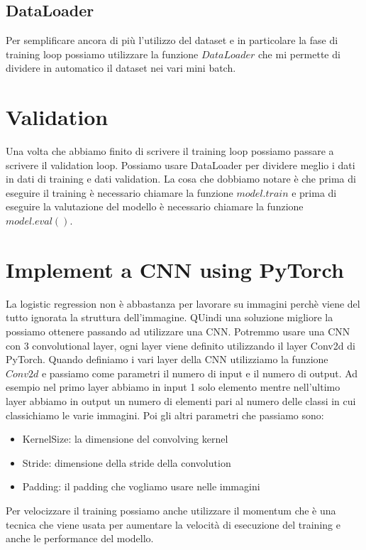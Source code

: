 \documentclass[14pt]{extreport}
\begin{document}
\subsection{DataLoader}

Per semplificare ancora di più l'utilizzo del dataset e in particolare la fase di training loop possiamo utilizzare la funzione $DataLoader$ che mi
permette di dividere in automatico il dataset nei vari mini batch.

\section{Validation}

Una volta che abbiamo finito di scrivere il training loop possiamo passare a scrivere il validation loop. Possiamo usare DataLoader per dividere
meglio i dati in dati di training e dati validation. La cosa che dobbiamo notare è che prima di eseguire il training è necessario chiamare la funzione
$model.train$ e prima di eseguire la valutazione del modello è necessario chiamare la funzione $model.eval()$.

\section{Implement a CNN using PyTorch}

La logistic regression non è abbastanza per lavorare su immagini perchè viene del tutto ignorata la struttura dell'immagine. QUindi una soluzione
migliore la possiamo ottenere passando ad utilizzare una CNN. Potremmo usare una CNN con 3 convolutional layer, ogni layer viene definito utilizzando
il layer Conv2d di PyTorch. Quando definiamo i vari layer della CNN utilizziamo la funzione $Conv2d$ e passiamo come parametri il numero di input e il
numero di output. Ad esempio nel primo layer abbiamo in input 1 solo elemento mentre nell'ultimo layer abbiamo in output un numero di elementi pari al
numero delle classi in cui classichiamo le varie immagini. Poi gli altri parametri che passiamo sono:
\begin{itemize}
	\item KernelSize: la dimensione del convolving kernel
	\item Stride: dimensione della stride della convolution
	\item Padding: il padding che vogliamo usare nelle immagini
\end{itemize}

Per velocizzare il training possiamo anche utilizzare il momentum che è una tecnica che viene usata per aumentare la velocità di esecuzione del
training e anche le performance del modello.
\end{document}
